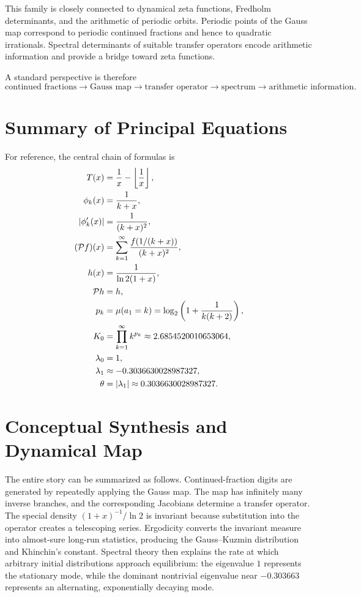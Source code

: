 \documentclass[a4paper]{article}
\begin{document}
This family is closely connected to dynamical zeta functions, Fredholm determinants, and the arithmetic of periodic orbits. Periodic points of the Gauss map correspond to periodic continued fractions and hence to quadratic irrationals. Spectral determinants of suitable transfer operators encode arithmetic information and provide a bridge toward zeta functions.

A standard perspective is therefore
\begin{equation}
\text{continued fractions}
\longrightarrow
\text{Gauss map}
\longrightarrow
\text{transfer operator}
\longrightarrow
\text{spectrum}
\longrightarrow
\text{arithmetic information}.
\end{equation}

\section{Summary of Principal Equations}
For reference, the central chain of formulas is
\begin{align}
 T(x)&=\frac1x-\left\lfloor\frac1x\right\rfloor,\\
 \phi_k(x)&=\frac1{k+x},\\
 |\phi_k'(x)|&=\frac1{(k+x)^2},\\
 (\mathcal{P} f)(x)&=\sum_{k=1}^{\infty}\frac{f(1/(k+x))}{(k+x)^2},\\
 h(x)&=\frac1{\ln2(1+x)},\\
 \mathcal{P} h&=h,\\
 p_k&=\mu(a_1=k)
 =\log_2\left(1+\frac1{k(k+2)}\right),\\
 K_0&=\prod_{k=1}^{\infty}k^{p_k}\approx2.6854520010653064,\\
 \lambda_0&=1,\\
 \lambda_1&\approx-0.3036630028987327,\\
 \theta&=|\lambda_1|\approx0.3036630028987327.
\end{align}

\section{Conceptual Synthesis and Dynamical Map}
The entire story can be summarized as follows. Continued-fraction digits are generated by repeatedly applying the Gauss map. The map has infinitely many inverse branches, and the corresponding Jacobians determine a transfer operator. The special density $(1+x)^{-1}/\ln2$ is invariant because substitution into the operator creates a telescoping series. Ergodicity converts the invariant measure into almost-sure long-run statistics, producing the Gauss--Kuzmin distribution and Khinchin's constant. Spectral theory then explains the rate at which arbitrary initial distributions approach equilibrium: the eigenvalue $1$ represents the stationary mode, while the dominant nontrivial eigenvalue near $-0.303663$ represents an alternating, exponentially decaying mode.
\end{document}
